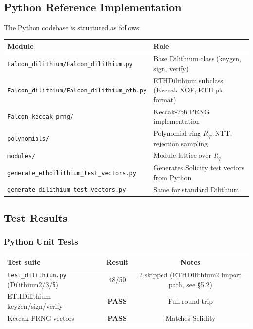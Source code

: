 \documentclass[11pt,a4paper]{article}
\begin{document}
\subsection{Python Reference Implementation}

The Python codebase is structured as follows:

\begin{center}
\begin{tabular}{ll}
\toprule
\textbf{Module} & \textbf{Role} \\
\midrule
\texttt{Falcon\_dilithium/Falcon\_dilithium.py} & Base Dilithium class (keygen, sign, verify) \\
\texttt{Falcon\_dilithium/Falcon\_dilithium\_eth.py} & ETHDilithium subclass (Keccak XOF, ETH pk format) \\
\texttt{Falcon\_keccak\_prng/} & Keccak-256 PRNG implementation \\
\texttt{polynomials/} & Polynomial ring $R_q$, NTT, rejection sampling \\
\texttt{modules/} & Module lattice over $R_q$ \\
\texttt{generate\_ethdilithium\_test\_vectors.py} & Generates Solidity test vectors from Python \\
\texttt{generate\_dilithium\_test\_vectors.py} & Same for standard Dilithium \\
\bottomrule
\end{tabular}
\end{center}

\subsection{Test Results}

\subsubsection{Python Unit Tests}

\begin{center}
\begin{tabular}{lcc}
\toprule
\textbf{Test suite} & \textbf{Result} & \textbf{Notes} \\
\midrule
\texttt{test\_dilithium.py} (Dilithium2/3/5) & 48/50 & 2 skipped (ETHDilithium2 import path, see §5.2) \\
ETHDilithium keygen/sign/verify & \textcolor{pass-green}{\textbf{PASS}} & Full round-trip \\
Keccak PRNG vectors & \textcolor{pass-green}{\textbf{PASS}} & Matches Solidity \\
\bottomrule
\end{tabular}
\end{center}
\end{document}
